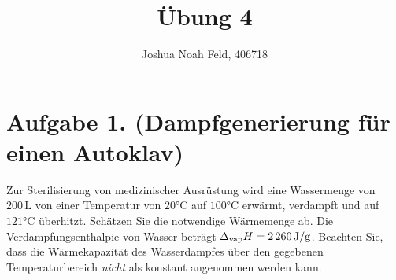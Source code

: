 \documentclass[german,12pt]{homework}
\title{Übung 4}
\author{Joshua Noah Feld, 406718}
\institute{RWTH Aachen University\\Aachener Verfahrenstechnik}
\begin{document}
    \maketitle

    \section*{Aufgabe 1. (Dampfgenerierung für einen Autoklav)}

    \begin{problem}
        Zur Sterilisierung von medizinischer Ausrüstung wird eine Wassermenge
        von \(200\,\si{\liter}\) von einer Temperatur von
        \(20\si{\degreeCelsius}\) auf \(100\si{\degreeCelsius}\) erwärmt,
        verdampft und auf \(121\si{\degreeCelsius}\) überhitzt. Schätzen Sie
        die notwendige Wärmemenge ab. Die Verdampfungsenthalpie von Wasser
        beträgt \(\Delta_\text{vap}H = 2\,260\,\si{\joule\per{\g}}\). Beachten
        Sie, dass die Wärmekapazität des Wasserdampfes über den gegebenen
        Temperaturbereich \emph{nicht} als konstant angenommen werden kann.
    \end{problem}
\end{document}
